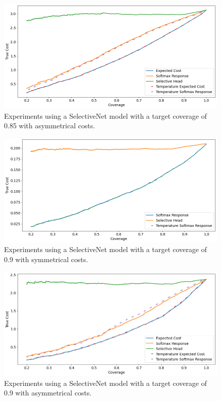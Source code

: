 \begin{figure}[h]
	\includegraphics[width=\textwidth]{images/multi-class/sn0.85-asym.png}
	\caption{Experiments using a SelectiveNet model with a target coverage of 0.85 with asymmetrical costs.}
\end{figure}

\begin{figure}[h]
	\includegraphics[width=\textwidth]{images/multi-class/sn0.9-sym.png}
	\caption{Experiments using a SelectiveNet model with a target coverage of 0.9 with symmetrical costs.}
\end{figure}

\begin{figure}[h]
	\includegraphics[width=\textwidth]{images/multi-class/sn0.9-asym.png}
	\caption{Experiments using a SelectiveNet model with a target coverage of 0.9 with asymmetrical costs.}
\end{figure}

